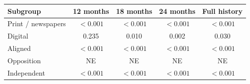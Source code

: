 \begingroup\small
\setlength{\tabcolsep}{3pt}
\renewcommand{\arraystretch}{1.25}
\noindent%
\begin{tabular*}{\linewidth}{@{\extracolsep{\fill}}lcccc@{}}
\toprule
Subgroup & 12 months & 18 months & 24 months & Full history \\
\midrule
Print / newspapers & $<0.001$ & $<0.001$ & $<0.001$ & $<0.001$ \\
Digital & 0.235 & 0.010 & 0.002 & 0.030 \\
Aligned & $<0.001$ & $<0.001$ & $<0.001$ & $<0.001$ \\
Opposition & NE & NE & NE & NE \\
Independent & $<0.001$ & $<0.001$ & $<0.001$ & $<0.001$ \\
\bottomrule
\end{tabular*}\par\endgroup
